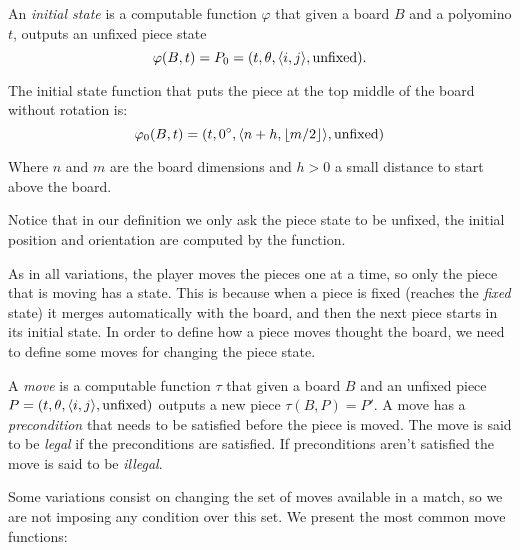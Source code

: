 \begin{definition} 
  An \emph{initial state} is a computable function $\varphi$ that given a board $B$ and a polyomino $t$, outputs an unfixed piece state $$\varphi(B,t) = P_0 = \piece[t][\theta][i][j][\text{unfixed}].$$
\end{definition}


\begin{example} The initial state function that puts the piece at the top middle of the board without rotation is:
$$\varphi_0(B,t) = \piece[t][0^\circ][n + h][\lfloor m / 2 \rfloor][\text{unfixed}]$$

Where $n$ and $m$ are the board dimensions and $h > 0$ a small distance to start above the board.

\end{example}


Notice that in our definition we only ask the piece state to be unfixed, the initial position and orientation are computed by the function. 

\vspace{10px}

As in all variations, the player moves the pieces one at a time, so only the piece that is moving has a state. This is because when a piece is fixed (reaches the \emph{fixed} state) it merges automatically with the board, and then the next piece starts in its initial state. In order to define how a piece moves thought the board, we need to define some moves for changing the piece state. 

\begin{definition} 
  A \emph{move} is a computable function $\tau$ that given a board $B$ and an unfixed piece $P = \piece[t][\theta][i][j][\text{unfixed}]$ outputs a new piece $\tau(B, P) = P'$. A move has a \emph{precondition} that needs to be satisfied before the piece is moved. The move is said to be \emph{legal} if the preconditions are satisfied. If preconditions aren't satisfied the move is said to be \emph{illegal}.
\end{definition}

Some variations consist on changing the set of  moves available in a match, so we are not imposing any condition over this set. We present the most common move functions:


